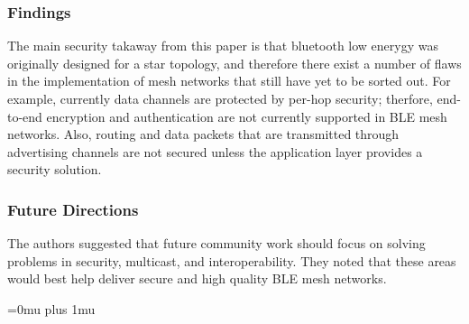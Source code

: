 \subsubsection{Findings}

\noindent
The main security takaway from this paper is that bluetooth low enerygy was originally designed for a star topology, and therefore there exist a number of flaws in the implementation of mesh networks that still have yet to be sorted out. For example, currently data channels are protected by per-hop security; therfore, end-to-end encryption and authentication are not currently supported in BLE mesh networks. Also, routing and data packets that are transmitted through advertising channels are not secured unless the application layer provides a security solution.

\subsubsection{Future Directions}

\noindent
The authors suggested that future community work should focus on solving problems in security, multicast, and interoperability. They noted that these areas would best help deliver secure and high quality BLE mesh networks.

\Urlmuskip=0mu plus 1mu\relax

\pagebreak